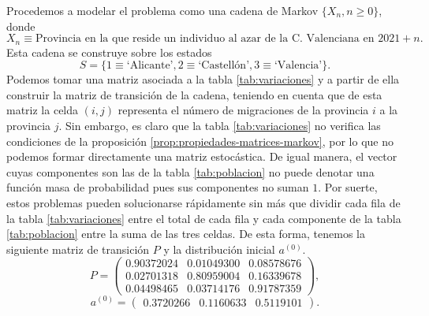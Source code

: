 \begin{ejemplo}
        Procedemos a modelar el problema como una cadena de Markov $\{X_n,n\geq0\}$, donde 
        $$X_n \equiv \text{Provincia en la que reside un individuo al azar de la C. Valenciana en }2021+n.$$ 
        Esta cadena se construye sobre los estados 
        $$
        S=\{1\equiv\text{`Alicante'}, 2\equiv\text{`Castellón'},3\equiv\text{`Valencia'}\}.
        $$
        Podemos tomar una matriz asociada a la tabla \ref{tab:variaciones} y a partir de ella construir la matriz de transición de la cadena, teniendo en cuenta que de esta matriz la celda $(i,j)$ representa el número de migraciones de la provincia $i$ a la provincia $j$. Sin embargo, es claro que la tabla \ref{tab:variaciones} no verifica las condiciones de la proposición \ref{prop:propiedades-matrices-markov}, por lo que no podemos formar directamente una matriz estocástica. De igual manera, el vector cuyas componentes son las de la tabla \ref{tab:poblacion} no puede denotar una función masa de probabilidad pues sus componentes no suman $1$. Por suerte, estos problemas pueden solucionarse rápidamente sin más que dividir cada fila de la tabla \ref{tab:variaciones} entre el total de cada fila y cada componente de la tabla \ref{tab:poblacion} entre la suma de las tres celdas. De esta forma, tenemos la siguiente matriz de transición $P$ y la distribución inicial $a^{(0)}$.
        \begin{equation*}
            \label{eq:ejemplo-migraciones-matriz}
            P = \begin{pmatrix}
                0.90372024 & 0.01049300 & 0.08578676 \\
                0.02701318 & 0.80959004 & 0.16339678 \\
                0.04498465 & 0.03714176 & 0.91787359
            \end{pmatrix}, 
        \end{equation*}
        \begin{equation*}
            a^{(0)} = \begin{pmatrix}
                0.3720266 &
                0.1160633 &
                0.5119101
            \end{pmatrix}.
        \end{equation*}
         

\end{ejemplo}
